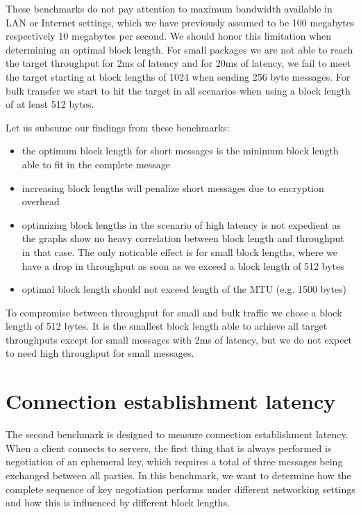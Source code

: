 These benchmarks do not pay attention to maximum bandwidth available in LAN or Internet settings, which we have previously assumed to be 100 megabytes respectively 10 megabytes per second.
We should honor this limitation when determining an optimal block length.
For small packages we are not able to reach the target throughput for 2ms of latency and for 20ms of latency, we fail to meet the target starting at block lengths of 1024 when sending 256 byte messages.
For bulk transfer we start to hit the target in all scenarios when using a block length of at least 512 bytes.

\medskip

Let us subsume our findings from these benchmarks:
\begin{itemize}
    \item the optimum block length for short messages is the minimum block length able to fit in the complete message
    \item increasing block lengths will penalize short messages due to encryption overhead
    \item optimizing block lengths in the scenario of high latency is not expedient as the graphs show no heavy correlation between block length and throughput in that case.
        The only noticable effect is for small block lengths, where we have a drop in throughput as soon as we exceed a block length of 512 bytes
    \item optimal block length should not exceed length of the MTU (e.g. 1500 bytes)
\end{itemize}

To compromise between throughput for small and bulk traffic we chose a block length of 512 bytes.
It is the smallest block length able to achieve all target throughputs except for small messages with 2ms of latency, but we do not expect to need high throughput for small messages.

\section{Connection establishment latency}

The second benchmark is designed to measure connection establishment latency.
When a client connects to servers, the first thing that is always performed is negotiation of an ephemeral key, which requires a total of three messages being exchanged between all parties.
In this benchmark, we want to determine how the complete sequence of key negotiation performs under different networking settings and how this is influenced by different block lengths.

